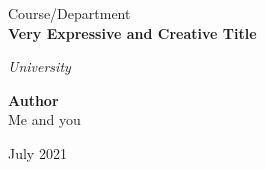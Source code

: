 \begin{titlepage}
  \begin{center}
    
    
    \vspace*{5.5cm}
    
    \Large
    Course/Department \\
    \LARGE
    \textbf{Very Expressive and Creative Title}
      
    \vspace{1cm}
    
    \textit{University}
    
    \vspace{1cm}
      
    \Large      
    \textbf{Author}\\
    Me and you
    
    \vspace{2.5cm}
    
    \Large
    July 2021
      
\end{center}
\end{titlepage}  
